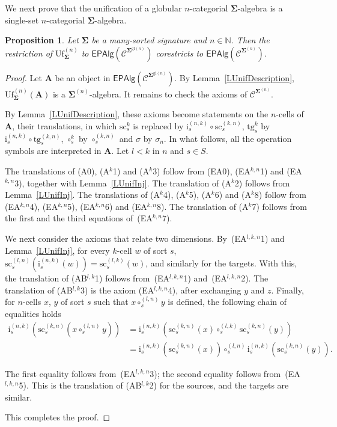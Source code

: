 \documentclass[a4paper, reqno
]{amsart}
\newcommand{\sig}[1]{\mathbf{#1}}             %
\newcommand{\spec}[1]{\boldsymbol{\mathcal{#1}}} %
\newcommand{\gl}{\mathrm{gl}}                %
\newcommand{\src}{\mathrm{sc}}
\newcommand{\tgt}{\mathrm{tg}}
\newcommand{\Uf}{\mathrm{Uf}}
\theoremstyle{plain}
\newtheorem{proposition}[theorem]{Proposition}
\theoremstyle{definition}
\begin{document}
We next prove that the unification of a globular $n$-categorial $\sig{\Sigma}$-algebra is a single-set $n$-categorial $\sig{\Sigma}$-algebra.

\begin{proposition}\label{PUnifDerivor}
Let $\sig{\Sigma}$ be a many-sorted signature and $n\in\mathbb{N}$.
Then the restriction of $\Uf^{(n)}_{\sig{\Sigma}}$ to $\mathsf{EPAlg}(\spec{C}^{\sig{\Sigma}^{\gl(n)}})$ corestricts to $\mathsf{EPAlg}(\spec{C}^{\sig{\Sigma}^{(n)}})$.
\end{proposition}
\begin{proof}
Let $\mathbf{A}$ be an object in $\mathsf{EPAlg}(\spec{C}^{\sig{\Sigma}^{\gl(n)}})$.
By Lemma~\ref{LUnifDescription}, $\Uf^{(n)}_{\sig{\Sigma}}(\mathbf{A})$ is a $\sig{\Sigma}^{(n)}$-algebra.
It remains to check the axioms of $\spec{C}^{\sig{\Sigma}^{(n)}}$.

By Lemma~\ref{LUnifDescription}, these axioms become statements on the $n$-cells of $\mathbf{A}$, their translations, in which $\src^{k}_{s}$ is replaced by $\mathrm{i}^{(n,k)}_{s}\circ\src^{(k,n)}_{s}$, $\tgt^{k}_{s}$ by $\mathrm{i}^{(n,k)}_{s}\circ\tgt^{(k,n)}_{s}$, $\circ^{k}_{s}$ by $\circ^{(k,n)}_{s}$ and $\sigma$ by $\sigma_{n}$.
In what follows, all the operation symbols are interpreted in $\mathbf{A}$.
Let $l<k$ in $n$ and $s\in S$.

The translations of (A0), (A$^{k}$1) and (A$^{k}$3) follow from (EA0), (EA$^{k,n}$1) and (EA$^{k,n}$3), together with Lemma~\ref{LUnifInj}.
The translation of (A$^{k}$2) follows from Lemma~\ref{LUnifInj}.
The translations of (A$^{k}$4), (A$^{k}$5), (A$^{k}$6) and (A$^{k}$8) follow from (EA$^{k,n}$4), (EA$^{k,n}$5), (EA$^{k,n}$6) and (EA$^{k,n}$8).
The translation of (A$^{k}$7) follows from the first and the third equations of~(EA$^{k,n}$7).

We next consider the axioms that relate two dimensions.
By~(EA$^{l,k,n}$1) and Lemma~\ref{LUnifInj}, for every $k$-cell $w$ of sort $s$, $\src^{(l,n)}_{s}(\mathrm{i}^{(n,k)}_{s}(w))=\src^{(l,k)}_{s}(w)$, and similarly for the targets.
With this, the translation of (AB$^{l,k}$1) follows from~(EA$^{l,k,n}$1) and~(EA$^{l,k,n}$2).
The translation of (AB$^{l,k}$3) is the axiom (EA$^{l,k,n}$4), after exchanging $y$ and $z$.
Finally, for $n$-cells $x$, $y$ of sort $s$ such that $x\circ^{(l,n)}_{s}y$ is defined, the following chain of equalities holds
\begin{align*}
\mathrm{i}^{(n,k)}_{s}\left(\src^{(k,n)}_{s}\left(x\circ^{(l,n)}_{s}y\right)\right)
&=
\mathrm{i}^{(n,k)}_{s}\left(\src^{(k,n)}_{s}(x)\circ^{(l,k)}_{s}\src^{(k,n)}_{s}(y)\right)
\tag{1}
\\&=
\mathrm{i}^{(n,k)}_{s}\left(\src^{(k,n)}_{s}(x)\right)\circ^{(l,n)}_{s}\mathrm{i}^{(n,k)}_{s}\left(\src^{(k,n)}_{s}(y)\right).
\tag{2}
\end{align*}

The first equality follows from~(EA$^{l,k,n}$3); the second equality follows from~(EA$^{l,k,n}$5).
This is the translation of (AB$^{l,k}$2) for the sources, and the targets are similar.

This completes the proof.
\end{proof}
\end{document}
